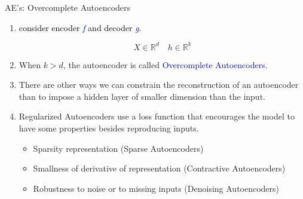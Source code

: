 \documentclass[serif, aspectratio=169]{beamer}
\begin{document}
\begin{frame}{AE’s: Overcomplete Autoencoders}
\small
    \begin{enumerate}
        \item \textcolor{black}{consider encoder} \textit{\textcolor{blue}{f}} \textcolor{black}{and decoder} \textit{\textcolor{blue}{g}}.
        
        \begin{equation*}
            X \in \mathbb{R}^d \quad h \in \mathbb{R}^k
        \end{equation*}
        
        \vspace{0.15cm}
        \item When \( k > d \), the autoencoder is called \textcolor{blue}{Overcomplete Autoencoders}.
        
        \vspace{0.2cm}
        \item There are other ways we can constrain the reconstruction of an autoencoder than to impose a hidden layer of smaller dimension than the input.
        
        \vspace{0.2cm}
        \item Regularized Autoencoders use a loss function that encourages the model to have some properties besides reproducing inputs.
        \begin{itemize}
            \item Sparsity representation (Sparse Autoencoders)
            \item Smallness of derivative of representation (Contractive Autoencoders)
            \item Robustness to noise or to missing inputs (Denoising Autoencoders)
        \end{itemize}
    \end{enumerate}
\end{frame}
\end{document}
